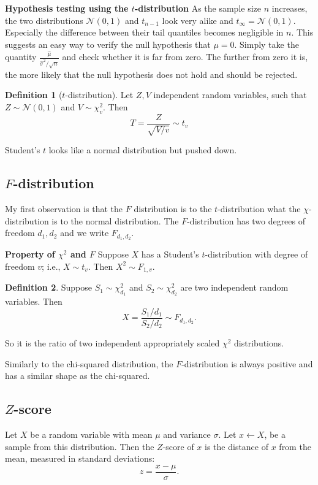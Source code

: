 \documentclass[11pt]{article}
\theoremstyle{definition}
\newtheorem{defn}{Definition}
\newcommand{\Normal}[2]{\ensuremath{\mathcal N (#1, #2)}}
\begin{document}
\begin{shaded}
	\textbf{Hypothesis testing using the $t$-distribution} \newline
	As the sample size $n$ increases, the two distributions $\Normal 0 1$ and
	$t_{n-1}$ look very alike and $t_\infty=\Normal 0 1$. Especially the
	difference between their tail quantiles becomes negligible in $n$.
	This suggests an easy way to verify the null hypothesis that $\mu=0$. Simply
	take the quantity $\frac{\hat\mu}{\hat\sigma^2/\sqrt n}$ and check whether
	it is far from zero. The further from zero it is, the more likely that the
	null hypothesis does not hold and should be rejected.
\end{shaded}


\begin{defn}[$t$-distribution]
	Let $Z,V$ independent random variables, such that $Z\sim\Normal 0 1$ and
	$V\sim\chi_v^2$. Then
	\[T=\frac{Z}{\sqrt{V/v}}\sim t_v\]
\end{defn}

Student's $t$ looks like a normal distribution but pushed down.

\subsection{$F$-distribution}
My first observation is that the $F$ distribution is to the $t$-distribution
what the $\chi$-distribution is to the normal distribution. The $F$-distribution
has two degrees of freedom $d_1,d_2$ and we write $F_{d_1,d_2}$.


\begin{shaded}
	\textbf{Property of $\chi^2$ and $F$} \newline
	Suppose $X$ has a Student's $t$-distribution with degree of freedom $v$;
	i.e., $X\sim t_v$. Then $X^2\sim F_{1,v}$.
\end{shaded}

\begin{defn}
	Suppose $S_1\sim\chi_{d_1}^2$ and $S_2\sim\chi_{d_2}^2$ are two independent
	random variables. Then
	\[X=\frac{S_1/d_1}{S_2/d_2}\sim F_{d_1,d_2}.\]
\end{defn}
So it is the ratio of two independent appropriately scaled $\chi^2$ distributions.

Similarly to the chi-squared distribution, the $F$-distribution is always positive
and has a similar shape as the chi-squared.

\subsection{$Z$-score}
Let $X$ be a random variable with mean $\mu$ and variance $\sigma$. Let
$x\leftarrow X$, be a sample from this distribution. Then the $Z$-score of $x$
is the distance of $x$ from the mean, measured in standard deviations:
\[ z=\frac{x-\mu}{\sigma}.\]
\end{document}
